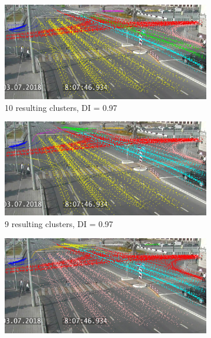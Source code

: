 \begin{figure}[!htb]
	\centering
	\begin{subfigure}[!htb]{0.23\textwidth}
		\centering{}
		\includegraphics[width=\textwidth]{images/10cl-rdp-n-1.png}
		\caption{10 resulting clusters, DI = 0.97}
		\label{fig:10cl-rdp-n-1}
	\end{subfigure}
	\hfill
	\begin{subfigure}[!htb]{0.23\textwidth}
		\centering{}
		\includegraphics[width=\textwidth]{images/9cl-rdp-n-1.png}
		\caption{9 resulting clusters, DI = 0.97}
		\label{fig:9cl-rdp-n-1}
	\end{subfigure}
	\hfill
	\begin{subfigure}[!htb]{0.23\textwidth}
		\centering{}
		\includegraphics[width=\textwidth]{images/8cl-rdp-n-1.png}

\end{subfigure}
\end{figure}
